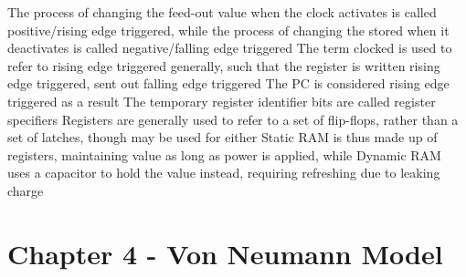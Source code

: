 \documentclass[11 pt, twoside]{article}
\newenvironment{outline*}
{
	\begin{outline}[enumerate]
	}
	{\end{outline}
}
\begin{document}
\begin{outline*}
\3 The process of changing the feed-out value when the clock activates is called positive/rising edge triggered, while the process of changing the stored when it deactivates is called negative/falling edge triggered
\3 The term clocked is used to refer to rising edge triggered generally, such that the register is written rising edge triggered, sent out falling edge triggered
\4 The PC is considered rising edge triggered as a result
\3 The temporary register identifier bits are called register specifiers
\2 Registers are generally used to refer to a set of flip-flops, rather than a set of latches, though may be used for either
\1 Static RAM is thus made up of registers, maintaining value as long as power is applied, while Dynamic RAM uses a capacitor to hold the value instead, requiring refreshing due to leaking charge
\end{outline*}
\section{Chapter 4 - Von Neumann Model}
\end{document}
